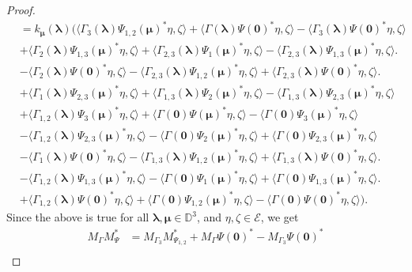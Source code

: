 \documentclass[10pt,a4paper]{amsart}
\newcommand{\D}{\mathbb{D}}
\newcommand{\cle}{\mathcal{E}}
\begin{document}
\begin{proof}
\begin{align*}
&= k_{\bm{{\mu}}}(\bm{\lambda}) \Big( \langle  \Gamma_3(\bm{\lambda}) \Psi_{1,2}(\bm{\mu})^* \eta,  \zeta \rangle + \langle  \Gamma(\bm{\lambda}) \Psi(\bm{0})^* \eta,  \zeta \rangle - \langle  \Gamma_3(\bm{\lambda}) \Psi(\bm{0})^* \eta,  \zeta \rangle \\
&+ \langle  \Gamma_2(\bm{\lambda})\Psi_{1,3}(\bm{\mu})^* \eta,  \zeta \rangle + \langle  \Gamma_{2,3}(\bm{\lambda}) \Psi_{1}(\bm{\mu})^* \eta,  \zeta \rangle - \langle \Gamma_{2,3}(\bm{\lambda}) \Psi_{1,3}(\bm{\mu})^* \eta,  \zeta \rangle. \\
&- \langle \Gamma_2(\bm{\lambda}) \Psi(\bm{0})^* \eta,  \zeta \rangle - \langle \Gamma_{2,3}(\bm{\lambda}) \Psi_{1,2}(\bm{\mu})^* \eta,  \zeta \rangle + \langle \Gamma_{2,3}(\bm{\lambda}) \Psi(\bm{0})^* \eta,  \zeta \rangle. \\
&+ \langle \Gamma_1(\bm{\lambda}) \Psi_{2,3}(\bm{\mu})^* \eta,  \zeta \rangle +  \langle \Gamma_{1,3}(\bm{\lambda}) \Psi_{2}(\bm{\mu})^* \eta,  \zeta \rangle - \langle \Gamma_{1,3}(\bm{\lambda}) \Psi_{2,3}(\bm{\mu})^* \eta,  \zeta \rangle \\
&+ \langle \Gamma_{1,2}(\bm{\lambda})\Psi_{3}(\bm{\mu})^* \eta,  \zeta \rangle + \langle \Gamma(\bm{0})\Psi(\bm{\mu})^* \eta,  \zeta \rangle - \langle \Gamma(\bm{0})  \Psi_{3}(\bm{\mu})^* \eta,  \zeta \rangle\\
&- \langle \Gamma_{1,2}(\bm{\lambda}) \Psi_{2,3}(\bm{\mu})^* \eta,  \zeta \rangle - \langle \Gamma(\bm{0}) \Psi_{2}(\bm{\mu})^* \eta,  \zeta \rangle + \langle \Gamma(\bm{0}) \Psi_{2,3}(\bm{\mu})^* \eta,  \zeta \rangle \\
&- \langle \Gamma_1(\bm{\lambda}) \Psi(\bm{0})^* \eta,  \zeta \rangle - \langle \Gamma_{1,3}(\bm{\lambda}) \Psi_{1,2}(\bm{\mu})^* \eta,  \zeta \rangle + \langle \Gamma_{1,3}(\bm{\lambda}) \Psi(\bm{0})^* \eta,  \zeta \rangle.\\
&- \langle \Gamma_{1,2}(\bm{\lambda})\Psi_{1,3}(\bm{\mu})^* \eta,  \zeta \rangle - \langle \Gamma (\bm{0}) \Psi_{1}(\bm{\mu})^* \eta,  \zeta \rangle + \langle \Gamma (\bm{0}) \Psi_{1,3}(\bm{\mu})^* \eta,  \zeta \rangle . \\
&+ \langle \Gamma_{1,2}(\bm{\lambda}) \Psi(\bm{0})^* \eta,  \zeta \rangle + \langle \Gamma(\bm{0}) \Psi_{1,2}(\bm{\mu})^* \eta,  \zeta \rangle - \langle \Gamma(\bm{0}) \Psi(\bm{0})^* \eta,  \zeta \rangle \Big).
\end{align*}
Since the above is true for all $\bm{\lambda}, \bm{\mu} \in \D^3$, and $\eta, \zeta \in \cle$, we get
\begin{align*}
M_{\Gamma}M_{\Psi}^*  &=  M_{\Gamma_3}M_{\Psi_{1,2}}^* + M_{\Gamma} \Psi(\bm{0})^* - M_{\Gamma_3} \Psi(\bm{0})^*\\

\end{align*}
\end{proof}
\end{document}
